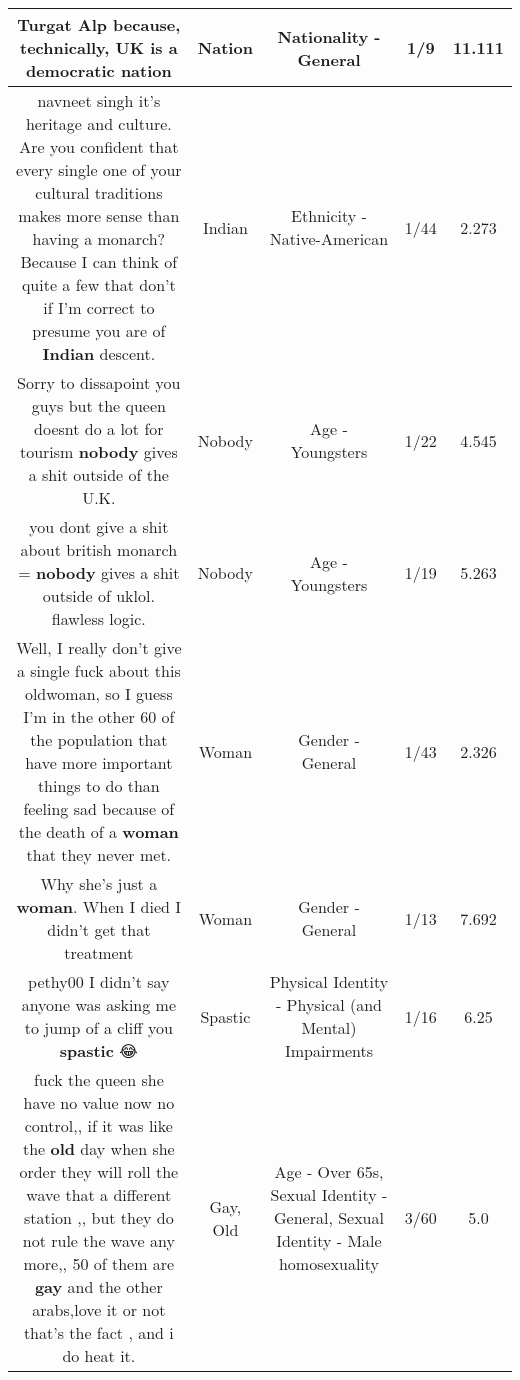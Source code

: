 \documentclass[11pt]{article}
\newlength\mylength
\begin{document}
\begin{center}
\begin{longtable}{|C{.65\mylength}|C{.30\mylength}|C{.12\mylength}|C{.12\mylength}|C{.12\mylength}|}
  \small Turgat Alp because, technically, UK is a democratic nation\normalsize   & Nation & Nationality - General & 1/9 & 11.111 \\  \hline
  \small navneet singh it's heritage and culture. Are you confident that every single one of your cultural traditions makes more sense than having a monarch? Because I can think of quite a few that don't if I'm correct to presume you are of \textbf{Indian} descent.\normalsize   & Indian & Ethnicity - Native-American & 1/44 & 2.273 \\  \hline
  \small Sorry to dissapoint you guys but the queen doesnt do a lot for tourism \textbf{nobody} gives a shit outside of the U.K.\normalsize   & Nobody & Age - Youngsters & 1/22 & 4.545 \\  \hline
  \small you dont give a shit about british monarch = \textbf{nobody} gives a shit outside of uklol. flawless logic.\normalsize   & Nobody & Age - Youngsters & 1/19 & 5.263 \\  \hline
  \small Well, I really don't give a single fuck about this oldwoman, so I guess I'm in the other 60 of the population that have more important things to do than feeling sad because of the death of a \textbf{woman} that they never met.\normalsize   & Woman & Gender - General & 1/43 & 2.326 \\  \hline
  \small Why she's just a \textbf{woman}. When I died I didn't get that treatment\normalsize   & Woman & Gender - General & 1/13 & 7.692 \\  \hline
  \small pethy00 I didn't say anyone was asking me to jump of a cliff you \textbf{spastic} 😂\normalsize   & Spastic & Physical Identity - Physical (and Mental) Impairments & 1/16 & 6.25 \\  \hline
  \small fuck the queen she have no value now no control,, if it was like the \textbf{old} day when she order they will roll the wave that a different station ,, but they do not rule the wave any more,, 50 of them are  \textbf{g\textbf{ay}} and the other arabs,love it or not that's the fact , and i do heat it.\normalsize   & Gay, Old & Age - Over 65s, Sexual Identity - General, Sexual Identity - Male homosexuality & 3/60 & 5.0 \\  \hline

\end{longtable}
\end{center}
\end{document}
